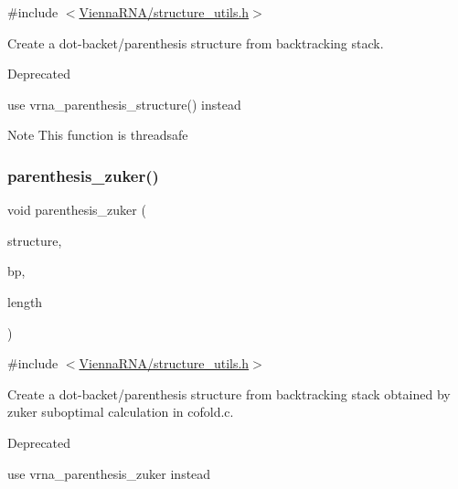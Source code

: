 {\ttfamily \#include $<$\mbox{\hyperlink{structure__utils_8h}{Vienna\+R\+N\+A/structure\+\_\+utils.\+h}}$>$}



Create a dot-\/backet/parenthesis structure from backtracking stack. 

\begin{DoxyRefDesc}{Deprecated}
\item[\mbox{\hyperlink{deprecated__deprecated000148}{Deprecated}}]use vrna\+\_\+parenthesis\+\_\+structure() instead\end{DoxyRefDesc}


\begin{DoxyNote}{Note}
This function is threadsafe 
\end{DoxyNote}
\mbox{\label{group__struct__utils_gab9c5c8311bd5120900585d4fa50c2df0}} 
\subsubsection{\texorpdfstring{parenthesis\+\_\+zuker()}{parenthesis\_zuker()}}
{\footnotesize\ttfamily void parenthesis\+\_\+zuker (\begin{DoxyParamCaption}\item[{char $\ast$}]{structure,  }\item[{\mbox{\hyperlink{group__data__structures_gaa651bda42e7692f08cb603cd6834b0ee}{vrna\+\_\+bp\+\_\+stack\+\_\+t}} $\ast$}]{bp,  }\item[{int}]{length }\end{DoxyParamCaption})}



{\ttfamily \#include $<$\mbox{\hyperlink{structure__utils_8h}{Vienna\+R\+N\+A/structure\+\_\+utils.\+h}}$>$}



Create a dot-\/backet/parenthesis structure from backtracking stack obtained by zuker suboptimal calculation in cofold.\+c. 

\begin{DoxyRefDesc}{Deprecated}
\item[\mbox{\hyperlink{deprecated__deprecated000149}{Deprecated}}]use vrna\+\_\+parenthesis\+\_\+zuker instead\end{DoxyRefDesc}



